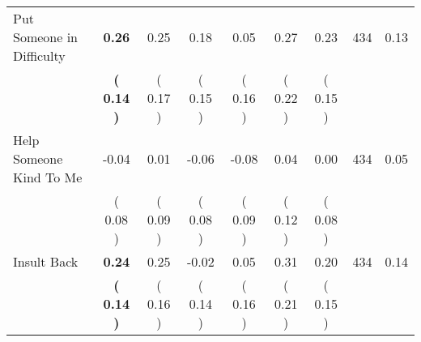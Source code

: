\begin{tabular}{lcccccccc}
Put Someone in Difficulty & \textbf{     0.26} &      0.25 &      0.18 &      0.05 &      0.27 &      0.23 & 434 &       0.13 \\ 
 & \textbf{(     0.14 )} & (     0.17 ) & (     0.15 ) & (     0.16 ) & (     0.22 ) & (     0.15 ) & \\
Help Someone Kind To Me &     -0.04 &      0.01 &     -0.06 &     -0.08 &      0.04 &      0.00 & 434 &       0.05 \\ 
 & (     0.08 ) & (     0.09 ) & (     0.08 ) & (     0.09 ) & (     0.12 ) & (     0.08 ) & \\
Insult Back & \textbf{     0.24} &      0.25 &     -0.02 &      0.05 &      0.31 &      0.20 & 434 &       0.14 \\ 
 & \textbf{(     0.14 )} & (     0.16 ) & (     0.14 ) & (     0.16 ) & (     0.21 ) & (     0.15 ) & \\
\bottomrule
\end{tabular}
